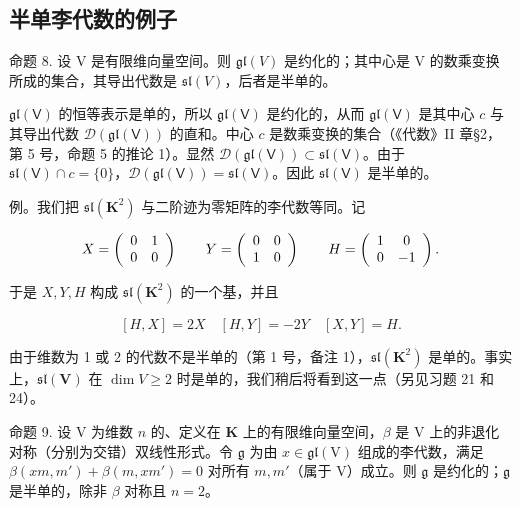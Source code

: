 \subsection{半单李代数的例子}

命题 8. 设 V 是有限维向量空间。则 \(\mathfrak{gl}(V)\) 是约化的；其中心是 V 的数乘变换所成的集合，其导出代数是 \(\mathfrak{sl}(V)\)，后者是半单的。

\(\mathfrak{gl}(\mathsf{V})\) 的恒等表示是单的，所以 \(\mathfrak{gl}(\mathsf{V})\) 是约化的，从而 \(\mathfrak{gl}(\mathsf{V})\) 是其中心 \(c\) 与其导出代数 \(\mathcal{D}(\mathfrak{gl}(\mathsf{V}))\) 的直和。中心 \(c\) 是数乘变换的集合（《代数》II 章§2，第 5 号，命题 5 的推论 1）。显然 \(\mathcal{D}(\mathfrak{gl}(\mathsf{V})) \subset \mathfrak{sl}(\mathsf{V})\)。由于 \(\mathfrak{sl}(\mathsf{V}) \cap c = \{0\}\)，\(\mathcal{D}(\mathfrak{gl}(\mathsf{V})) = \mathfrak{sl}(\mathsf{V})\)。因此 \(\mathfrak{sl}(\mathsf{V})\) 是半单的。

例。我们把 \(\mathfrak{sl}(\mathbf{K}^{2})\) 与二阶迹为零矩阵的李代数等同。记

\[
X = \left( \begin{array}{c c} 0 & 1 \\ 0 & 0 \end{array} \right) \qquad Y = \left( \begin{array}{c c} 0 & 0 \\ 1 & 0 \end{array} \right) \qquad H = \left( \begin{array}{c c} 1 & 0 \\ 0 & - 1 \end{array} \right).
\]

于是 \(X, Y, H\) 构成 \(\mathfrak{sl}(\mathbf{K}^2)\) 的一个基，并且

\[
[ H, X ] = 2 X \quad [ H, Y ] = - 2 Y \quad [ X, Y ] = H.
\]

由于维数为 1 或 2 的代数不是半单的（第 1 号，备注 1），\(\mathfrak{sl}(\mathbf{K}^2)\) 是单的。事实上，\(\mathfrak{sl}(\mathbf{V})\) 在 \(\dim V \geqslant 2\) 时是单的，我们稍后将看到这一点（另见习题 21 和 24）。

命题 9. 设 \(\mathrm{V}\) 为维数 \(n\) 的、定义在 \(\mathbf{K}\) 上的有限维向量空间，\(\beta\) 是 \(\mathrm{V}\) 上的非退化对称（分别为交错）双线性形式。令 \(\mathfrak{g}\) 为由 \(x \in \mathfrak{gl}(\mathrm{V})\) 组成的李代数，满足 \(\beta (xm, m') + \beta (m, xm') = 0\) 对所有 \(m, m'\)（属于 \(\mathrm{V}\)）成立。则 \(\mathfrak{g}\) 是约化的；\(\mathfrak{g}\) 是半单的，除非 \(\beta\) 对称且 \(n = 2\)。

